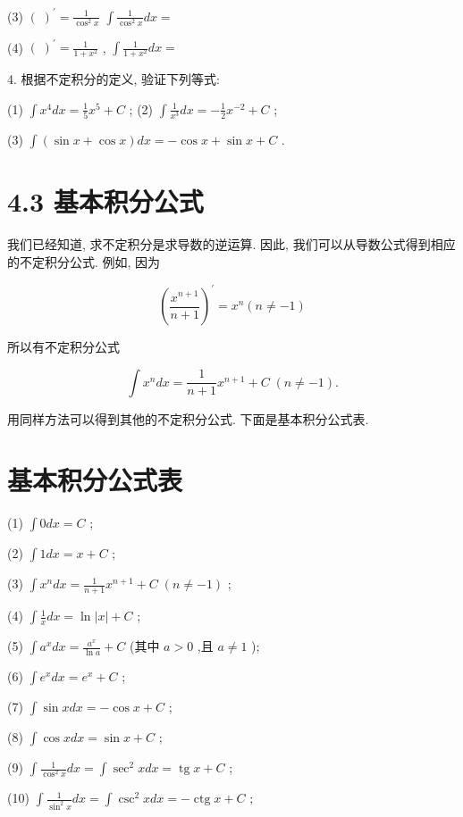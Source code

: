 \documentclass[10pt]{article}
\begin{document}
(3) \({\left( \;\right) }^{\prime } = \frac{1}{{\cos }^{2}x}\) \(\int \frac{1}{{\cos }^{2}x}{dx} =\)

(4) \({\left( \;\right) }^{\prime } = \frac{1}{1 + {x}^{2}}\) , \(\int \frac{1}{1 + {x}^{2}}{dx} =\)

4. 根据不定积分的定义, 验证下列等式:

(1) \(\int {x}^{4}{dx} = \frac{1}{5}{x}^{5} + C\) ; (2) \(\int \frac{1}{{x}^{3}}{dx} = - \frac{1}{2}{x}^{-2} + C\) ;

(3) \(\int \left( {\sin x + \cos x}\right) {dx} = - \cos x + \sin x + C\) .

\section*{4.3 基本积分公式}

我们已经知道, 求不定积分是求导数的逆运算. 因此, 我们可以从导数公式得到相应的不定积分公式. 例如, 因为

\[
{\left( \frac{{x}^{n + 1}}{n + 1}\right) }^{\prime } = {x}^{n}\left( {n \neq - 1}\right)
\]

所以有不定积分公式

\[
\int {x}^{n}{dx} = \frac{1}{n + 1}{x}^{n + 1} + C\;\left( {n \neq - 1}\right) .
\]

用同样方法可以得到其他的不定积分公式. 下面是基本积分公式表.

\section*{基本积分公式表}

(1) \(\int {0dx} = C\) ;

(2) \(\int {1dx} = x + C\) ;

(3) \(\int {x}^{n}{dx} = \frac{1}{n + 1}{x}^{n + 1} + C\;\left( {n \neq - 1}\right)\) ;

(4) \(\int \frac{1}{x}{dx} = \ln \left| x\right| + C\) ;

(5) \(\int {a}^{x}{dx} = \frac{{a}^{x}}{\ln a} + C\) (其中 \(a > 0\) ,且 \(a \neq 1\) );

(6) \(\int {e}^{x}{dx} = {e}^{x} + C\) ;

(7) \(\int \sin {xdx} = - \cos x + C\) ;

(8) \(\int \cos {xdx} = \sin x + C\) ;

(9) \(\int \frac{1}{{\cos }^{2}x}{dx} = \int {\sec }^{2}{xdx} = \operatorname{tg}x + C\) ;

(10) \(\int \frac{1}{{\sin }^{2}x}{dx} = \int {\csc }^{2}{xdx} = - \operatorname{ctg}x + C\) ;
\end{document}
